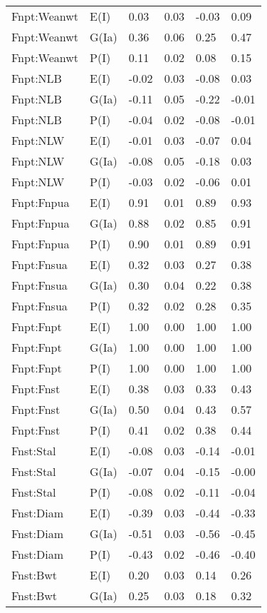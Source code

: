 \begin{center}
\begin{longtable}{|p{1.1in}|p{0.7in}|p{0.7in}|p{0.6in}|p{0.6in}|p{0.6in}|}
  Fnpt:Weanwt & E(I) & 0.03 & 0.03 & -0.03 & 0.09 \\ 
  Fnpt:Weanwt & G(Ia) & 0.36 & 0.06 & 0.25 & 0.47 \\ 
  Fnpt:Weanwt & P(I) & 0.11 & 0.02 & 0.08 & 0.15 \\ 
  Fnpt:NLB & E(I) & -0.02 & 0.03 & -0.08 & 0.03 \\ 
  Fnpt:NLB & G(Ia) & -0.11 & 0.05 & -0.22 & -0.01 \\ 
  Fnpt:NLB & P(I) & -0.04 & 0.02 & -0.08 & -0.01 \\ 
  Fnpt:NLW & E(I) & -0.01 & 0.03 & -0.07 & 0.04 \\ 
  Fnpt:NLW & G(Ia) & -0.08 & 0.05 & -0.18 & 0.03 \\ 
  Fnpt:NLW & P(I) & -0.03 & 0.02 & -0.06 & 0.01 \\ 
  Fnpt:Fnpua & E(I) & 0.91 & 0.01 & 0.89 & 0.93 \\ 
  Fnpt:Fnpua & G(Ia) & 0.88 & 0.02 & 0.85 & 0.91 \\ 
  Fnpt:Fnpua & P(I) & 0.90 & 0.01 & 0.89 & 0.91 \\ 
  Fnpt:Fnsua & E(I) & 0.32 & 0.03 & 0.27 & 0.38 \\ 
  Fnpt:Fnsua & G(Ia) & 0.30 & 0.04 & 0.22 & 0.38 \\ 
  Fnpt:Fnsua & P(I) & 0.32 & 0.02 & 0.28 & 0.35 \\ 
  Fnpt:Fnpt & E(I) & 1.00 & 0.00 & 1.00 & 1.00 \\ 
  Fnpt:Fnpt & G(Ia) & 1.00 & 0.00 & 1.00 & 1.00 \\ 
  Fnpt:Fnpt & P(I) & 1.00 & 0.00 & 1.00 & 1.00 \\ 
  Fnpt:Fnst & E(I) & 0.38 & 0.03 & 0.33 & 0.43 \\ 
  Fnpt:Fnst & G(Ia) & 0.50 & 0.04 & 0.43 & 0.57 \\ 
  Fnpt:Fnst & P(I) & 0.41 & 0.02 & 0.38 & 0.44 \\ 
  Fnst:Stal & E(I) & -0.08 & 0.03 & -0.14 & -0.01 \\ 
  Fnst:Stal & G(Ia) & -0.07 & 0.04 & -0.15 & -0.00 \\ 
  Fnst:Stal & P(I) & -0.08 & 0.02 & -0.11 & -0.04 \\ 
  Fnst:Diam & E(I) & -0.39 & 0.03 & -0.44 & -0.33 \\ 
  Fnst:Diam & G(Ia) & -0.51 & 0.03 & -0.56 & -0.45 \\ 
  Fnst:Diam & P(I) & -0.43 & 0.02 & -0.46 & -0.40 \\ 
  Fnst:Bwt & E(I) & 0.20 & 0.03 & 0.14 & 0.26 \\ 
  Fnst:Bwt & G(Ia) & 0.25 & 0.03 & 0.18 & 0.32 \\ 

\end{longtable}
\end{center}
